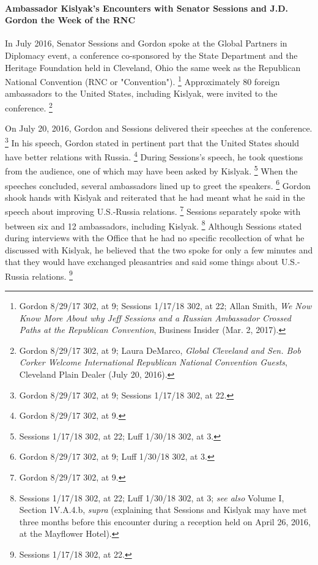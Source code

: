 \paragraph{Ambassador Kislyak's Encounters with Senator Sessions and J.D. Gordon the Week of the RNC}

In July 2016, Senator Sessions and Gordon spoke at the Global Partners in Diplomacy event, a conference co-sponsored by the State Department and the Heritage Foundation held in Cleveland, Ohio the same week as the Republican National Convention (RNC or "Convention").%
\footnote{Gordon 8/29/17 302, at 9;
Sessions 1/17/18 302, at 22;
Allan Smith, \textit{We Now Know More About why Jeff Sessions and a Russian Ambassador Crossed Paths at the Republican Convention}, Business Insider (Mar. 2, 2017).}
Approximately 80 foreign ambassadors to the United States, including Kislyak, were invited to the conference.%
\footnote{Gordon 8/29/17 302, at 9;
Laura DeMarco, \textit{Global Cleveland and Sen. Bob Corker Welcome International Republican National Convention Guests}, Cleveland Plain Dealer (July 20, 2016).
}

On July 20, 2016, Gordon and Sessions delivered their speeches at the conference.%
\footnote{Gordon 8/29/17 302, at 9;
Sessions 1/17/18 302, at 22.}
In his speech, Gordon stated in pertinent part that the United States should have better relations with Russia.%
\footnote{Gordon 8/29/17 302, at 9.}
During Sessions's speech, he took questions from the audience, one of which may have been asked by Kislyak.%
\footnote{Sessions 1/17/18 302, at 22;
Luff 1/30/18 302, at 3.}
When the speeches concluded, several ambassadors lined up to greet the speakers.%
\footnote{Gordon 8/29/17 302, at 9;
Luff 1/30/18 302, at 3.}
Gordon shook hands with Kislyak and reiterated that he had meant what he said in the speech about improving U.S.-Russia relations.%
\footnote{Gordon 8/29/17 302, at 9.}
Sessions separately spoke with between six and 12 ambassadors, including Kislyak.%
\footnote{Sessions 1/17/18 302, at 22; Luff 1/30/18 302, at 3;
\textit{see also} Volume I, Section 1V.A.4.b, \textit{supra} (explaining that Sessions and Kislyak may have met three months before this encounter during a reception held on April 26, 2016, at the Mayflower Hotel).}
Although Sessions stated during interviews with the Office that he had no specific recollection of what he discussed with Kislyak, he believed that the two spoke for only a few minutes and that they would have exchanged pleasantries and said some things about U.S.-Russia relations.%
\footnote{Sessions 1/17/18 302, at 22.}

